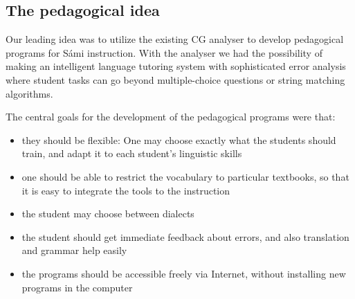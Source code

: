 \documentclass[11pt]{article}
\begin{document}



\subsection{The pedagogical idea} \label{pedidea}

Our leading idea was to utilize the existing CG analyser to develop pedagogical programs for Sámi instruction.  With the analyser we had the possibility of making an intelligent language tutoring system with sophisticated error analysis where student tasks can go beyond multiple-choice questions or string matching algorithms. 

The central goals for the development of the pedagogical programs were that:

\begin{itemize}
\item they should be flexible: One may choose exactly what the students should train, and adapt it to each student's linguistic skills 
\item one should be able to restrict the vocabulary to particular textbooks, so that it is easy to integrate the tools to the instruction
\item the student may choose between dialects 
\item the student should get immediate feedback about errors, and also translation and grammar help easily
\item the programs should be accessible freely via Internet, without installing new programs in the computer
\end{itemize}
\end{document}
